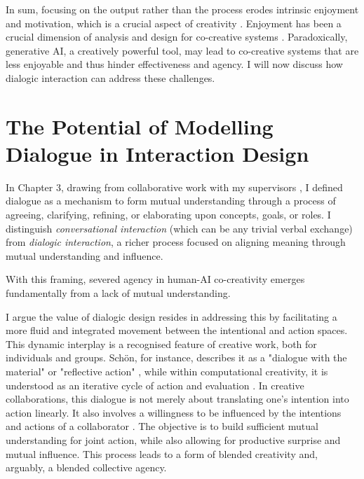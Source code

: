 In sum, focusing on the output rather than the process erodes intrinsic enjoyment and motivation, which is a crucial aspect of creativity \cite{Amabile1996-pt, Csikszentmihalyi1997-ui}. Enjoyment has been a crucial dimension of analysis and design for co-creative systems \cite{Davis2016-te, Cherry2014-ty, Rezwana2022-ui, Clark2018-yf, Lawton2023-gd, Yuan2022-kb, Li2024-yh, Kantosalo2015-pk, Resnick2005-fs}. Paradoxically, generative AI, a creatively powerful tool, may lead to co-creative systems that are less enjoyable and thus hinder effectiveness and agency. I will now discuss how dialogic interaction can address these challenges.

\section{The Potential of Modelling Dialogue in Interaction Design}

In Chapter 3, drawing from collaborative work with my supervisors \cite{}, I defined dialogue as a mechanism to form mutual understanding through a process of agreeing, clarifying, refining, or elaborating upon concepts, goals, or roles. I distinguish \textit{conversational interaction} (which can be any trivial verbal exchange) from \textit{dialogic interaction}, a richer process focused on aligning meaning through mutual understanding and influence. 

With this framing, severed agency in human-AI co-creativity emerges fundamentally from a lack of mutual understanding.

I argue the value of dialogic design resides in addressing this by facilitating a more fluid and integrated movement between the intentional and action spaces. This dynamic interplay is a recognised feature of creative work, both for individuals and groups. Schön, for instance, describes it as a "dialogue with the material" or "reflective action" \cite{Schon1992-jt, Schon1987-fy}, while within computational creativity, it is understood as an iterative cycle of action and evaluation \cite{Colton2021-bt, Colton2012-jc}. In creative collaborations, this dialogue is not merely about translating one's intention into action linearly. It also involves a willingness to be influenced by the intentions and actions of a collaborator \cite{Bown2020-oc}. The objective is to build sufficient mutual understanding for joint action, while also allowing for productive surprise and mutual influence. This process leads to a form of blended creativity and, arguably, a blended collective agency.

